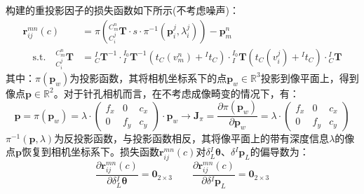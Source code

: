 \section{}
\label{sect:reproject_factor_jacobian}
构建的重投影因子的损失函数如下所示(不考虑噪声)：
\begin{equation}
  \begin{aligned}
    \boldsymbol{r}_{ij}^{mn}(c)      & =\pi\left({^{C_m^n}_{C_i^j}\boldsymbol{T}}\cdot s \cdot\pi^{-1}\left(\boldsymbol{p}_i^j,\lambda_i^j\right)\right) -\boldsymbol{p}_m^n                                                                            \\
    \quad\mathrm{s.t.}\quad
    {^{C_m^n}_{C_i^j}\boldsymbol{T}} & ={{^{I}_{C}}\boldsymbol{T}^{-1}}\cdot{{^{I_0}_{I}}\boldsymbol{T}^{-1}\left( t_{C}(v_m^n)+{^{I}t_C}\right) }\cdot{{^{I_0}_{I}}\boldsymbol{T}\left( t_{C}(v_i^j)+{^{I}t_C}\right) }\cdot{{^{I}_{C}}\boldsymbol{T}}
  \end{aligned}
\end{equation}
其中：$\pi(\boldsymbol{p}_w)$为投影函数，其将相机坐标系下的点$\boldsymbol{p}_w\in\mathbb{R}^3$投影到像平面上，得到像点$\boldsymbol{p}\in\mathbb{R}^2$。对于针孔相机而言，在不考虑成像畸变的情况下，有：
\begin{equation}
  \boldsymbol{p}=\pi(\boldsymbol{p}_w)=\lambda\cdot\begin{pmatrix}
    f_x & 0   & c_x \\
    0   & f_y & c_y
  \end{pmatrix}\cdot\boldsymbol{p}_w\to\boldsymbol{J}_{\pi}=
  \frac{\partial \pi(\boldsymbol{p}_w)}{\partial \boldsymbol{p}_w}=
  \lambda\cdot\begin{pmatrix}
    f_x & 0   & c_x \\
    0   & f_y & c_y
  \end{pmatrix}
\end{equation}
$\pi^{-1}(\boldsymbol{p},\lambda)$为反投影函数，与投影函数相反，其将像平面上的带有深度信息$\lambda$的像点$\boldsymbol{p}$恢复到相机坐标系下。损失函数$\boldsymbol{r}_{ij}^{mn}(c)$对$\delta{^{I}_{L}\boldsymbol{\theta}}$、$\delta{^{I}\boldsymbol{p}_L}$的偏导数为：
\begin{equation}
  \frac{\partial \boldsymbol{r}_{ij}^{mn}(c)}{\partial \delta {^{I}_{L}\boldsymbol{\theta}}}=\boldsymbol{0}_{2\times 3}
  \quad\quad
  \frac{\partial \boldsymbol{r}_{ij}^{mn}(c)}{\partial \delta {^{I}\boldsymbol{p}_L}}=\boldsymbol{0}_{2\times 3}
\end{equation}
